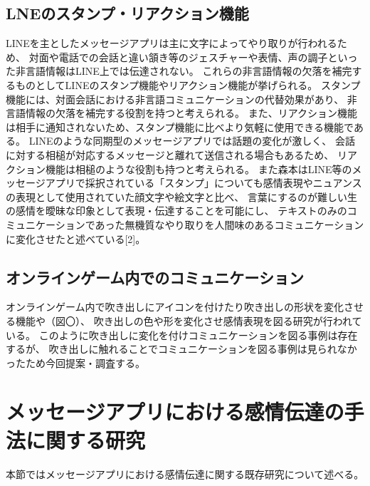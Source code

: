 \documentclass[11pt,a4paper]{ltjsreport}
\begin{document}
    \subsection{LNEのスタンプ・リアクション機能}
    LINEを主としたメッセージアプリは主に文字によってやり取りが行われるため、
    対面や電話での会話と違い頷き等のジェスチャーや表情、声の調子といった非言語情報はLINE上では伝達されない。
    これらの非言語情報の欠落を補完するものとしてLINEのスタンプ機能やリアクション機能が挙げられる。
    スタンプ機能には、対面会話における非言語コミュニケーションの代替効果があり\cite{Thesis2}、
    非言語情報の欠落を補完する役割を持つと考えられる。\cite{Thesis2}
    また、リアクション機能は相手に通知されないため、スタンプ機能に比べより気軽に使用できる機能である。
    LINEのような同期型のメッセージアプリでは話題の変化が激しく、
    会話に対する相槌が対応するメッセージと離れて送信される場合もあるため\cite{Thesis2}、
    リアクション機能は相槌のような役割も持つと考えられる。
    また森本はLINE等のメッセージアプリで採択されている「スタンプ」についても感情表現やニュアンスの表現として使用されていた顔文字や絵文字と比べ、
    言葉にするのが難しい生の感情を曖昧な印象として表現・伝達することを可能にし、
    テキストのみのコミュニケーションであった無機質なやり取りを人間味のあるコミュニケーションに変化させたと述べている[2]。

    \subsection{オンラインゲーム内でのコミュニケーション}
    オンラインゲーム内で吹き出しにアイコンを付けたり吹き出しの形状を変化させる機能や（図〇）、
    吹き出しの色や形を変化させ感情表現を図る研究が行われている\cite{Thesis2}。
    このように吹き出しに変化を付けコミュニケーションを図る事例は存在するが、
    吹き出しに触れることでコミュニケーションを図る事例は見られなかったため今回提案・調査する。

	\section{メッセージアプリにおける感情伝達の手法に関する研究}
    本節ではメッセージアプリにおける感情伝達に関する既存研究について述べる。
\end{document}
